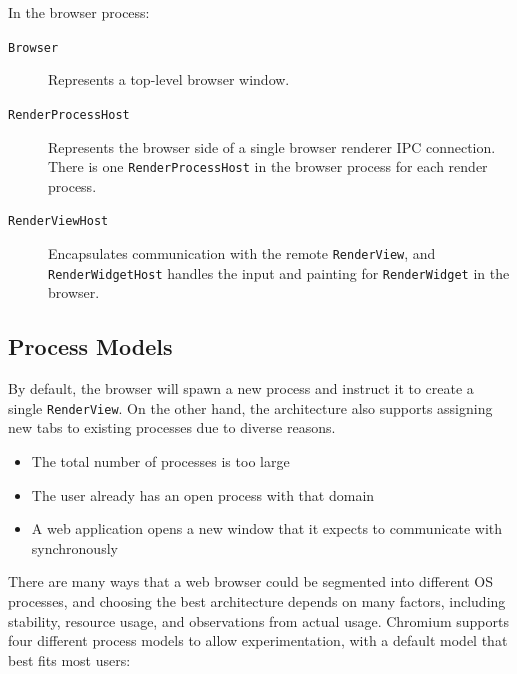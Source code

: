 \noindent In the browser process:
\begin{description}
\item[\texttt{Browser}] Represents a top-level browser window.
\item[\texttt{RenderProcessHost}] Represents the browser side of a single browser renderer IPC connection. There is one \texttt{RenderProcessHost} in the browser process for each render process.
\item[\texttt{RenderViewHost}] Encapsulates communication with the remote \texttt{RenderView}, and \texttt{RenderWidgetHost} handles the input and painting for \texttt{RenderWidget} in the browser.
\end{description}

\subsection{Process Models}

By default, the browser will spawn a new process and instruct it to create a single \texttt{RenderView}. On the other hand, the architecture also supports assigning new tabs to existing processes due to diverse reasons.

\begin{itemize}
    \item The total number of processes is too large
    \item The user already has an open process with that domain
    \item A web application opens a new window that it expects to communicate with synchronously
\end{itemize}

There are many ways that a web browser could be segmented into different OS processes, and choosing the best architecture depends on many factors, including stability, resource usage, and observations from actual usage. Chromium supports four different process models to allow experimentation, with a default model that best fits most users:

